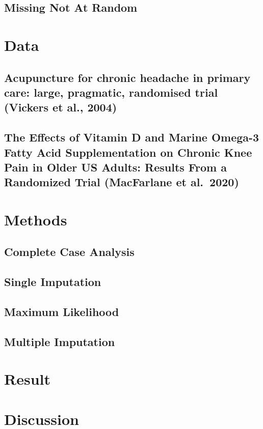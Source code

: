 \documentclass{article}
\begin{document}
\subsection{Missing Not At Random}\label{missing-not-at-random}

\section{Data}\label{data}

\subsection{Acupuncture for chronic headache in primary care: large,
pragmatic, randomised trial (Vickers et al.,
2004)}\label{acupuncture-for-chronic-headache-in-primary-care-large-pragmatic-randomised-trial-vickers-et-al.-2004}

\subsection{The Effects of Vitamin D and Marine Omega-3 Fatty Acid
Supplementation on Chronic Knee Pain in Older US Adults: Results From a
Randomized Trial (MacFarlane et
al.~2020)}\label{the-effects-of-vitamin-d-and-marine-omega-3-fatty-acid-supplementation-on-chronic-knee-pain-in-older-us-adults-results-from-a-randomized-trial-macfarlane-et-al.-2020}

\section{Methods}\label{methods}

\subsection{Complete Case Analysis}\label{complete-case-analysis}

\subsection{Single Imputation}\label{single-imputation}

\subsection{Maximum Likelihood}\label{maximum-likelihood}

\subsection{Multiple Imputation}\label{multiple-imputation}

\section{Result}\label{result}

\section{Discussion}\label{discussion}



\end{document}
